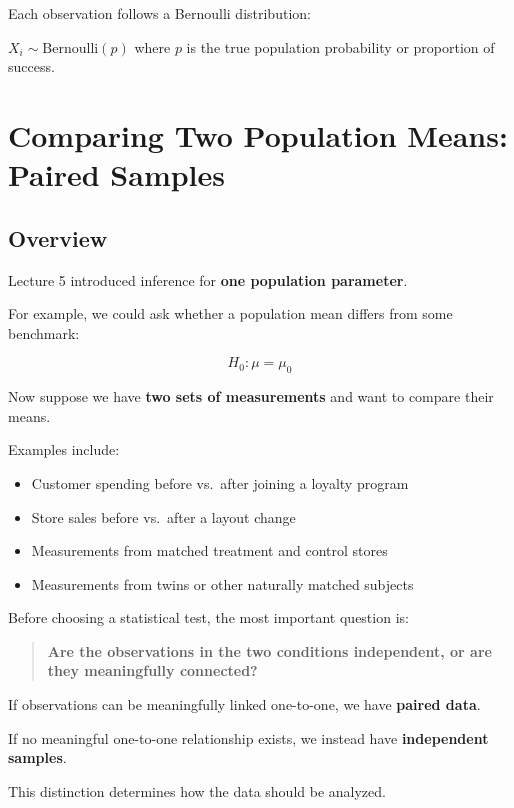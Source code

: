 \documentclass[
  letterpaper,
  DIV=11,
  numbers=noendperiod]{scrreprt}
\providecommand{\tightlist}{%
  \setlength{\itemsep}{0pt}\setlength{\parskip}{0pt}}
\begin{document}
Each observation follows a Bernoulli distribution:

\(X_i \sim \text{Bernoulli}(p)\) where \(p\) is the true population
probability or proportion of success.


\chapter{Comparing Two Population Means: Paired
Samples}\label{comparing-two-population-means-paired-samples}

\section{Overview}\label{overview-5}

Lecture 5 introduced inference for \textbf{one population parameter}.

For example, we could ask whether a population mean differs from some
benchmark:

\[
H_0:\mu=\mu_0
\]

Now suppose we have \textbf{two sets of measurements} and want to
compare their means.

Examples include:

\begin{itemize}
\tightlist
\item
  Customer spending before vs.~after joining a loyalty program
\item
  Store sales before vs.~after a layout change
\item
  Measurements from matched treatment and control stores
\item
  Measurements from twins or other naturally matched subjects
\end{itemize}

Before choosing a statistical test, the most important question is:

\begin{quote}
\textbf{Are the observations in the two conditions independent, or are
they meaningfully connected?}
\end{quote}

If observations can be meaningfully linked one-to-one, we have
\textbf{paired data}.

If no meaningful one-to-one relationship exists, we instead have
\textbf{independent samples}.

This distinction determines how the data should be analyzed.
\end{document}
